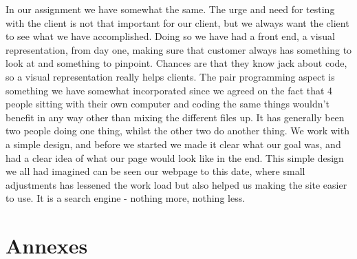 \documentclass[12pt,a4paper]{article}
\begin{document}
In our assignment we have somewhat the same. The urge and need for testing with the client is not that important for our client, but we always want the client to see what we have accomplished. Doing so we have had a front end, a visual representation, from day one, making sure that customer always has something to look at and something to pinpoint. Chances are that they know jack about code, so a visual representation really helps clients. The pair programming aspect is something we have somewhat incorporated since we agreed on the fact that 4 people sitting with their own computer and coding the same things wouldn't benefit in any way other than mixing the different files up. It has generally been two people doing one thing, whilst the other two do another thing. We work with a simple design, and before we started we made it clear what our goal was, and had a clear idea of what our page would look like in the end. This simple design we all had imagined can be seen our webpage to this date, where small adjustments has lessened the work load but also helped us making the site easier to use. It is a search engine - nothing more, nothing less. 

\newpage

\newpage
\section{Annexes}
\end{document}
